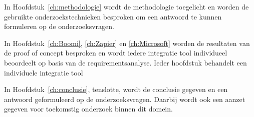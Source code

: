 \vspace{\baselineskip}

In Hoofdstuk~\ref{ch:methodologie} wordt de methodologie toegelicht en worden de gebruikte onderzoekstechnieken besproken om een antwoord te kunnen formuleren op de onderzoeksvragen.

\vspace{\baselineskip}


In Hoofdstuk~\ref{ch:Boomi}, \ref{ch:Zapier} en \ref{ch:Microsoft} worden de resultaten van de proof of concept besproken en wordt iedere integratie tool individueel beoordeelt op basis van de requirementsanalyse. Ieder hoofdstuk behandelt een individuele integratie tool

\vspace{\baselineskip}

In Hoofdstuk~\ref{ch:conclusie}, tenslotte, wordt de conclusie gegeven en een antwoord geformuleerd op de onderzoeksvragen. Daarbij wordt ook een aanzet gegeven voor toekomstig onderzoek binnen dit domein.